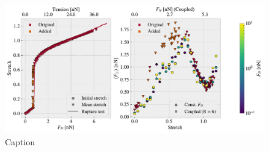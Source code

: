 \begin{figure}[H]
  \centering
  \includegraphics[width=0.9\linewidth]{figures/negative_coefficient/manual_coupling_free_hon2215.pdf}
  \caption{Caption}
  \label{fig:coupling_hon2215}
\end{figure}






